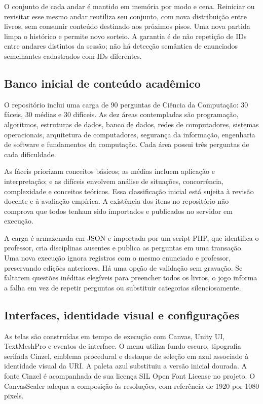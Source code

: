 \documentclass[12pt]{article}
\begin{document}
O conjunto de cada andar é mantido em memória por modo e cena. Reiniciar ou revisitar esse mesmo andar reutiliza seu conjunto, com nova distribuição entre livros, sem consumir conteúdo destinado aos próximos pisos. Uma nova partida limpa o histórico e permite novo sorteio. A garantia é de não repetição de IDs entre andares distintos da sessão; não há detecção semântica de enunciados semelhantes cadastrados com IDs diferentes.

\subsection{Banco inicial de conteúdo acadêmico}

O repositório inclui uma carga de 90 perguntas de Ciência da Computação: 30 fáceis, 30 médias e 30 difíceis. As dez áreas contempladas são programação, algoritmos, estruturas de dados, banco de dados, redes de computadores, sistemas operacionais, arquitetura de computadores, segurança da informação, engenharia de software e fundamentos da computação. Cada área possui três perguntas de cada dificuldade.

As fáceis priorizam conceitos básicos; as médias incluem aplicação e interpretação; e as difíceis envolvem análise de situações, concorrência, complexidade e conceitos teóricos. Essa classificação inicial está sujeita à revisão docente e à avaliação empírica. A existência dos itens no repositório não comprova que todos tenham sido importados e publicados no servidor em execução.

A carga é armazenada em JSON e importada por um script PHP, que identifica o professor, cria disciplinas ausentes e publica as perguntas em uma transação. Uma nova execução ignora registros com o mesmo enunciado e professor, preservando edições anteriores. Há uma opção de validação sem gravação. Se faltarem questões inéditas elegíveis para preencher todos os livros, o jogo informa a falha em vez de repetir perguntas ou substituir categorias silenciosamente.

\subsection{Interfaces, identidade visual e configurações}

As telas são construídas em tempo de execução com Canvas, Unity UI, TextMeshPro e eventos de interface. O menu utiliza fundo escuro, tipografia serifada Cinzel, emblema procedural e destaque de seleção em azul associado à identidade visual da URI. A paleta azul substituiu a versão inicial dourada. A fonte Cinzel é acompanhada de sua licença SIL Open Font License no projeto. O CanvasScaler adequa a composição às resoluções, com referência de 1920 por 1080 pixels.
\end{document}
